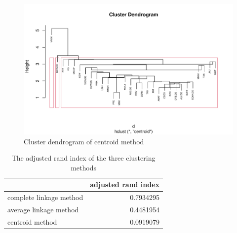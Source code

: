 \documentclass[11pt,a4paper,]{article}
\begin{document}
\begin{figure}
\centering
\includegraphics{ass2_files/figure-latex/centroid-1.pdf}
\caption{\label{fig:centroid}Cluster dendrogram of centroid method}
\end{figure}

\begin{table}

\caption{\label{tab:adjusted-index}The adjusted rand index of the three clustering methods}
\centering
\begin{tabular}[t]{l|r}
\hline
  & adjusted rand index\\
\hline
complete linkage method & 0.7934295\\
\hline
average linkage method & 0.4481954\\
\hline
centroid method & 0.0919079\\
\hline
\end{tabular}
\end{table}

\printbibliography
\end{document}
